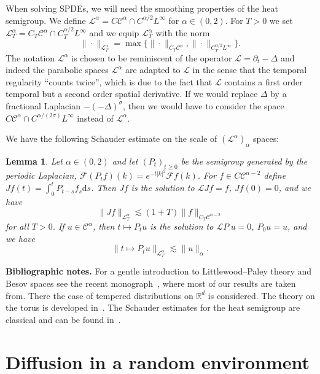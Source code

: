 \documentclass[a4paper,11pt]{article}
\newcommand{\cdummy}{\cdot}
\newcommand{\mathd}{\mathrm{d}}
\newcommand{\tmtextbf}[1]{{\bfseries{#1}}}
\newtheorem{lemma}{Lemma}
{\theorembodyfont{\rmfamily}\newtheorem{remark}{Remark}}
\newcommand{\LL}{\mathscr{L}}
\newcommand{\CF}{\mathscr{F}}
\newcommand{\CC}{\mathscr{C}}
\begin{document}
When solving SPDEs, we will need the smoothing properties of the heat
semigroup. 
We define $\LL^{\alpha} = C \CC^{\alpha} \cap C^{\alpha / 2} L^{\infty}$
for $\alpha \in (0, 2)$. For $T > 0$ we set $\LL^{\alpha}_T = C_T \CC^{\alpha}
\cap C^{\alpha / 2}_T L^{\infty}$ and we equip $\LL^{\alpha}_T$ with the norm
\[ \| \cdummy \|_{\LL^{\alpha}_T} = \max \{ \| \cdummy \|_{C_T \CC^{\alpha}},
   \| \cdummy \|_{C^{\alpha / 2}_T L^{\infty}} \} . \]
The notation $\LL^{\alpha}$ is chosen to be reminiscent of the operator $\LL =
\partial_t - \Delta$ and indeed the parabolic spaces $\LL^{\alpha}$ are
adapted to $\LL$ in the sense that the temporal regularity ``counts twice'',
which is due to the fact that $\LL$ contains a first order temporal but a
second order spatial derivative. If we would replace $\Delta$ by a fractional
Laplacian $- (- \Delta)^{\sigma}$, then we would have to consider the space $C
\CC^{\alpha} \cap C^{\alpha / (2 \sigma)} L^{\infty}$ instead of
$\LL^{\alpha}$.

We have the following Schauder estimate on the scale of $( \LL^{\alpha})_{\alpha}$ spaces:

\begin{lemma}
  \label{lem:schauder}Let $\alpha \in (0, 2)$ and let $(P_t)_{t \geqslant 0}$
  be the semigroup generated by the periodic Laplacian, $\CF (P_t f) (k) =
  e^{- t | k |^2} \CF f (k)$. For $f \in C \CC^{\alpha - 2}$ define $J f (t) =
  \int_0^t P_{t - s} f_s \mathd s$. Then $J f$ is the solution to $\LL J f = f$, $J f(0) = 0$, and we have
  \[ \| J f \|_{\LL^{\alpha}_T} \lesssim (1 + T) \| f \|_{C_T \CC^{\alpha -
     2}} \]
  for all $T > 0$. If $u \in \CC^{\alpha}$, then $t \mapsto P_t u$ is the solution to $\LL P_\cdot u = 0$, $P_0 u = u$, and we have
  \[ \| t \mapsto P_t u \|_{\LL^{\alpha}_T} \lesssim \| u \|_{\alpha} . \]
\end{lemma}

\tmtextbf{Bibliographic notes.} For a gentle introduction to Littlewood--Paley
theory and Besov spaces see the recent monograph~{\cite{Bahouri2011}}, where
most of our results are taken from. There the case of tempered distributions
on $\mathbb{R}^d$ is considered. The theory on the torus is developed
in~{\cite{Schmeisser1987}}. The Schauder estimates for the heat semigroup are
classical and can be found in~{\cite{Gubinelli2012,Gubinelli2014}}.

\section{Diffusion in a random environment}\label{sec:homogenization}
\end{document}
